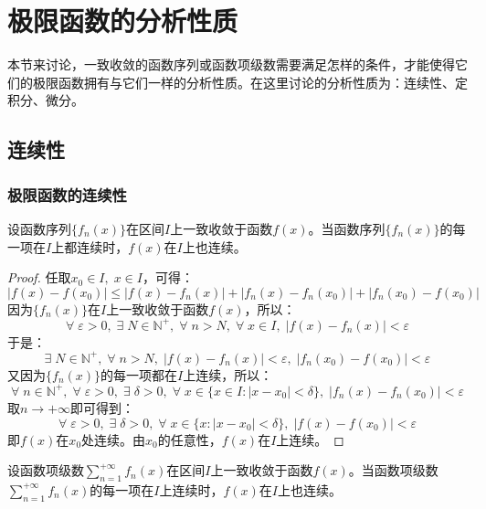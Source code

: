 \section{极限函数的分析性质}

本节来讨论，一致收敛的函数序列或函数项级数需要满足怎样的条件，才能使得它们的极限函数拥有与它们一样的分析性质。在这里讨论的分析性质为：连续性、定积分、微分。

\subsection{连续性}
\subsubsection{极限函数的连续性}
\begin{theorem}
	设函数序列$\{f_n(x)\}$在区间$I$上一致收敛于函数$f(x)$。当函数序列$\{f_n(x)\}$的每一项在$I$上都连续时，$f(x)$在$I$上也连续。
\end{theorem}
\begin{proof}
	任取$x_0\in I,\;x\in I$，可得：
	\begin{equation*}
		|f(x)-f(x_0)|
		\leqslant|f(x)-f_n(x)|+|f_n(x)-f_n(x_0)|+|f_n(x_0)-f(x_0)|
	\end{equation*}
	因为$\{f_n(x)\}$在$I$上一致收敛于函数$f(x)$，所以：
	\begin{equation*}
		\forall\;\varepsilon>0,\;\exists\;N\in\mathbb{N}^+,\;\forall\;n>N,\;\forall\;x\in I,\;|f(x)-f_n(x)|<\varepsilon
	\end{equation*}
	于是：
	\begin{equation*}
		\exists\;N\in\mathbb{N}^+,\;\forall\;n>N,\;|f(x)-f_n(x)|<\varepsilon,\;|f_n(x_0)-f(x_0)|<\varepsilon
	\end{equation*}
	又因为$\{f_n(x)\}$的每一项都在$I$上连续，所以：
	\begin{equation*}
		\forall\;n\in\mathbb{N}^+,\;\forall\;\varepsilon>0,\;\exists\;\delta>0,\;\forall\;x\in\{x\in I:|x-x_0|<\delta\},\;|f_n(x)-f_n(x_0)|<\varepsilon
	\end{equation*}
	取$n\to+\infty$即可得到：
	\begin{equation*}
		\forall\;\varepsilon>0,\;\exists\;\delta>0,\;\forall\;x\in\{x:|x-x_0|<\delta\},\;|f(x)-f(x_0)|<\varepsilon
	\end{equation*}
	即$f(x)$在$x_0$处连续。由$x_0$的任意性，$f(x)$在$I$上连续。
\end{proof}
\begin{theorem}
	设函数项级数$\sum\limits_{n=1}^{+\infty}f_n(x)$在区间$I$上一致收敛于函数$f(x)$。当函数项级数$\sum\limits_{n=1}^{+\infty}f_n(x)$的每一项在$I$上连续时，$f(x)$在$I$上也连续。
\end{theorem}

